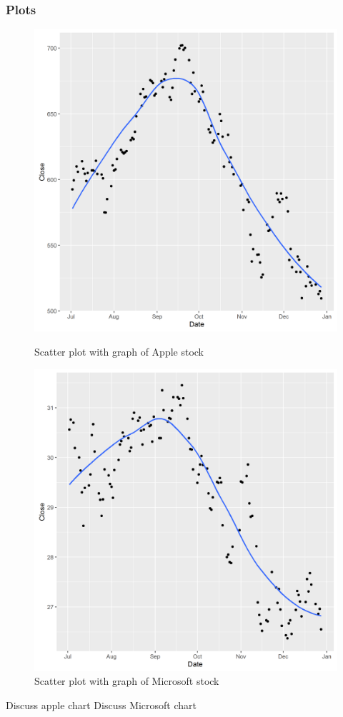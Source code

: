 \documentclass[paper=a4, fontsize=11pt]{scrartcl} %
\numberwithin{equation}{section} %
\numberwithin{figure}{section} %
\numberwithin{table}{section} %
\begin{document}
\subsubsection{Plots}
\begin{figure}[!htb]
  \includegraphics[width=\linewidth]{graph/AAPL4.png}
  \caption{Scatter plot with graph of Apple stock}
\endminipage\hfill
{}
  \includegraphics[width=\linewidth]{graph/MSFT4.png}
  \caption{Scatter plot with graph of Microsoft stock}
\endminipage\hfill

\end{figure}
Discuss apple chart
Discuss Microsoft chart
\end{document}
